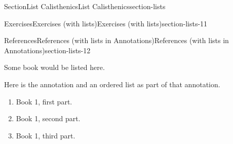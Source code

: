 \documentclass[twoside,10pt,]{article}
\numberwithin{equation}{section}
\begin{document}
\begin{sectionptx}{Section}{List Calisthenics}{}{List Calisthenics}{}{}{section-lists}
\begin{exercises-subsection}{Exercises}{Exercises (with lists)}{}{Exercises (with lists)}{}{}{section-lists-11}
\begin{conclusion}{}
\end{conclusion}%
\end{exercises-subsection}
%
%
\typeout{************************************************}
\typeout{************************************************}
%
\begin{references-subsection}{References}{References (with lists in Annotations)}{}{References (with lists in Annotations)}{}{}{section-lists-12}
\begin{referencelist}
\hypertarget{biblio-undetermined}{}Some book would be listed here. \par%
Here is the annotation and an ordered list as part of that annotation.%
\begin{enumerate}[label={(\alph*)}]
\item{}Book 1, first part.%
\item{}Book 1, second part.%
\item{}Book 1, third part.%
\end{enumerate}
%

\end{referencelist}
\end{references-subsection}
\end{sectionptx}
%
%
\typeout{************************************************}
\typeout{************************************************}
%
\end{document}
